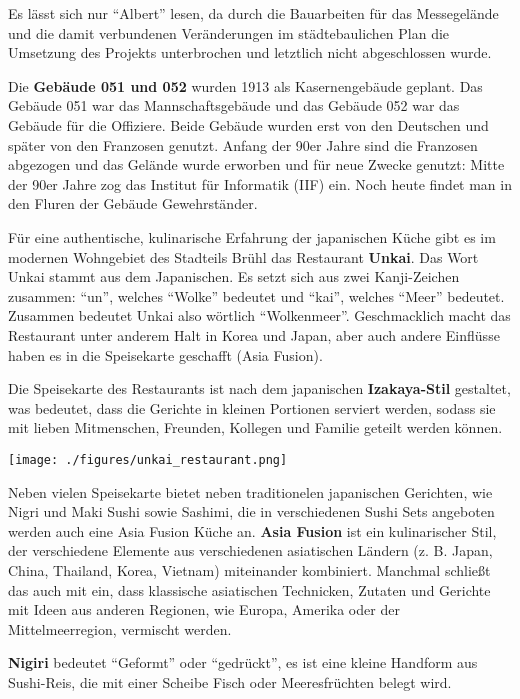 \documentclass[landscape, a4paper]{article}
\newcommand\alert[1]{\textcolor{PrimaryColor}{\textbf{#1}}}
\begin{document}
\hspace{0.4cm}
\begin{minipage}[t]{0.32\textwidth}
	\vspace{0cm}
	\setlength{\parskip}{0.25cm}

 Es lässt sich nur \enquote{Albert} lesen, da durch die Bauarbeiten für das Messegelände und die damit verbundenen Veränderungen im städtebaulichen Plan die Umsetzung des Projekts unterbrochen und letztlich nicht abgeschlossen wurde.

  Die \alert{Gebäude 051 und 052} wurden 1913 als Kasernengebäude geplant. Das Gebäude 051 war das Mannschaftsgebäude und das Gebäude 052 war das Gebäude für die Offiziere. Beide Gebäude wurden erst von den Deutschen und später von den Franzosen genutzt. Anfang der 90er Jahre sind die Franzosen abgezogen und das Gelände wurde erworben und für neue Zwecke genutzt: Mitte der 90er Jahre zog das Institut für Informatik (IIF) ein. Noch heute findet man in den Fluren der Gebäude Gewehrständer.

  Für eine authentische, kulinarische Erfahrung der japanischen Küche gibt es im modernen Wohngebiet des Stadteils Brühl das Restaurant \alert{Unkai}. Das Wort Unkai stammt aus dem Japanischen. Es setzt sich aus zwei Kanji-Zeichen zusammen: \enquote{un}, welches \enquote{Wolke} bedeutet und \enquote{kai}, welches \enquote{Meer} bedeutet. Zusammen bedeutet Unkai also wörtlich \enquote{Wolkenmeer}. Geschmacklich macht das Restaurant unter anderem Halt in Korea und Japan, aber auch andere Einflüsse haben es in die Speisekarte geschafft (Asia Fusion). 

  Die Speisekarte des Restaurants ist nach dem japanischen \alert{Izakaya-Stil} gestaltet, was bedeutet, dass die Gerichte in kleinen Portionen serviert werden, sodass sie mit lieben Mitmenschen, Freunden, Kollegen und Familie geteilt werden können. %

	\texttt{[image: ./figures/unkai\_restaurant.png]}
	\setlength{\parskip}{0.25cm}

  Neben vielen Speisekarte bietet neben traditionelen japanischen Gerichten, wie Nigri und Maki Sushi sowie Sashimi, die in verschiedenen Sushi Sets angeboten werden auch eine Asia Fusion Küche an. \alert{Asia Fusion} ist ein kulinarischer Stil, der verschiedene Elemente aus verschiedenen asiatischen Ländern (z. B. Japan, China, Thailand, Korea, Vietnam) miteinander kombiniert. Manchmal schließt das auch mit ein, dass klassische asiatischen Technicken, Zutaten und Gerichte mit Ideen aus anderen Regionen, wie Europa, Amerika oder der Mittelmeerregion, vermischt werden.

  \alert{Nigiri} bedeutet \enquote{Geformt} oder \enquote{gedrückt}, es ist eine kleine Handform aus Sushi-Reis, die mit einer Scheibe Fisch oder Meeresfrüchten belegt wird.
\end{minipage}
\end{document}
